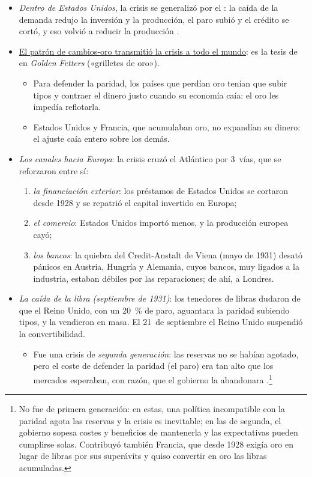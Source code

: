 \documentclass[11pt]{article}
\begin{document}
\begin{itemize}
\item \emph{Dentro de Estados Unidos}, la crisis se generalizó por el : la caída de la demanda redujo la inversión y la producción, el paro subió y el crédito se cortó, y eso volvió a reducir la producción .
\item \uline{El patrón de cambios-oro transmitió la crisis a todo el mundo}: es la tesis de  en \emph{Golden Fetters} («grilletes de oro»)\nocite{Eichengreen1992Golden}.
  \begin{itemize}
  \item Para defender la paridad, los países que perdían oro tenían que subir tipos y contraer el dinero justo cuando su economía caía: el oro les impedía reflotarla.
  \item Estados Unidos y Francia, que acumulaban oro, no expandían su dinero: el ajuste caía entero sobre los demás.
  \end{itemize}
\item \emph{Los canales hacia Europa}: la crisis cruzó el Atlántico por 3~vías, que se reforzaron entre sí:
  \begin{enumerate}
  \item \emph{la financiación exterior}: los préstamos de Estados Unidos se cortaron desde 1928 y se repatrió el capital invertido en Europa;
  \item \emph{el comercio}: Estados Unidos importó menos, y la producción europea cayó;
  \item \emph{los bancos}: la quiebra del Credit-Anstalt de Viena (mayo de 1931) desató pánicos en Austria, Hungría y Alemania, cuyos bancos, muy ligados a la industria, estaban débiles por las reparaciones; de ahí, a Londres.
  \end{enumerate}
\item \emph{La caída de la libra (septiembre de 1931)}: los tenedores de libras dudaron de que el Reino Unido, con un 20~\% de paro, aguantara la paridad subiendo tipos, y la vendieron en masa. El 21~de septiembre el Reino Unido suspendió la convertibilidad.
  \begin{itemize}
  \item Fue una crisis de \emph{segunda generación}: las reservas no se habían agotado, pero el coste de defender la paridad (el paro) era tan alto que los mercados esperaban, con razón, que el gobierno la abandonara\nocite{EichengreenJeanne2000} .\footnote{No fue de primera generación: en estas, una política incompatible con la paridad agota las reservas y la crisis es inevitable; en las de segunda, el gobierno sopesa costes y beneficios de mantenerla y las expectativas pueden cumplirse solas. Contribuyó también Francia, que desde 1928 exigía oro en lugar de libras por sus superávits y quiso convertir en oro las libras acumuladas.}
  \end{itemize}
\end{itemize}
\end{document}
